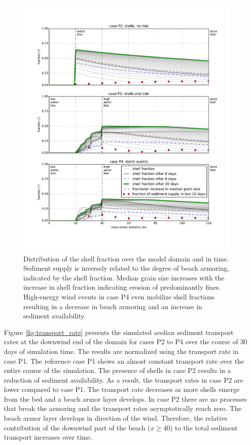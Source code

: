 \begin{figure}
  \centering
  \includegraphics[width=\columnwidth]{../Figures/shell_fraction}
  \caption{Distribution of the shell fraction over the model domain
    and in time. Sediment supply is inversely related to the degree of
    beach armoring, indicated by the shell fraction. Median grain size
    increases with the increase in shell fraction indicating erosion
    of predominantly fines. High-energy wind events in case P4 even
    mobilize shell fractions resulting in a decrease in beach armoring
    and an increase in sediment availability.}
  \label{fig:shell_fraction}
\end{figure}

Figure \ref{fig:transport_rate} presents the simulated aeolian
sediment transport rates at the downwind end of the domain for cases
P2 to P4 over the course of 30 days of simulation time. The results
are normalized using the transport rate in case P1. The reference case
P1 shows an almost constant transport rate over the entire course of
the simulation. The presence of shells in case P2 results in a
reduction of sediment availability. As a result, the transport rates
in case P2 are lower compared to case P1. The transport rate decreases
as more shells emerge from the bed and a beach armor layer
develops. In case P2 there are no processes that break the armoring
and the transport rates asymptotically reach zero. The beach armor
layer develops in direction of the wind. Therefore, the relative
contribution of the downwind part of the beach ($x \geq 40$) to the
total sediment transport increases over time.

